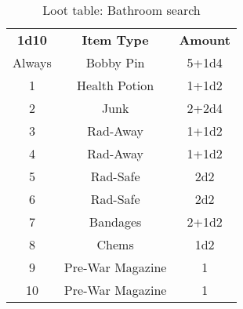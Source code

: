 \documentclass[11pt,a4paper,twocolumn]{book}
\begin{document}
    
        \begin{table}
        \centering
        \caption{Loot table: Bathroom search}
        \begin{tabular}{|c|c|c|}
           \hline
           \textbf{1d10}    & \textbf{Item Type}    & \textbf{Amount}  \\ 
                    Always  & Bobby Pin             & 5+1d4         \\
                    1       & Health Potion         & 1+1d2           \\
                    2       & Junk                  & 2+2d4        \\
                    3       & Rad-Away              & 1+1d2          \\ 
                    4       & Rad-Away              & 1+1d2          \\    
                    5       & Rad-Safe              & 2d2         \\
                    6       & Rad-Safe              & 2d2          \\  
                    7       & Bandages              & 2+1d2           \\  
                    8       & Chems                 & 1d2         \\
                    9       & Pre-War Magazine      & 1           \\
                    10      & Pre-War Magazine      & 1   \\ \hline
        \end{tabular}
        \label{tab:my_label}
    \end{table}
    
\end{document}
